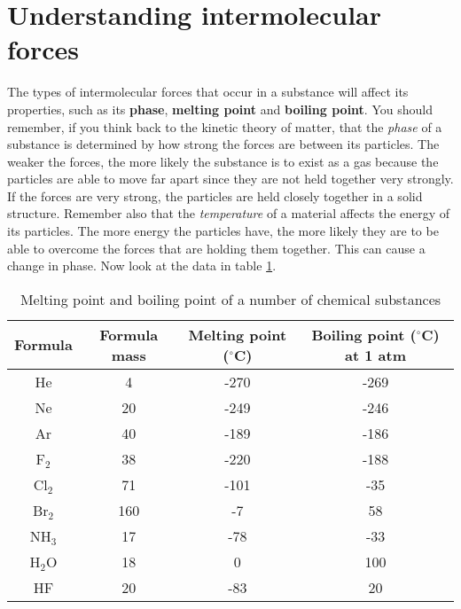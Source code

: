\section{Understanding intermolecular forces}
\label{sec:intermolecular:understanding}

The types of intermolecular forces that occur in a substance will affect its properties, such as its \textbf{phase}, \textbf{melting point} and \textbf{boiling point}. You should remember, if you think back to the kinetic theory of matter, that the \textit{phase} of a substance is determined by how strong the forces are between its particles. The weaker the forces, the more likely the substance is to exist as a gas because the particles are able to move far apart since they are not held together very strongly. If the forces are very strong, the particles are held closely together in a solid structure. Remember also that the \textit{temperature} of a material affects the energy of its particles. The more energy the particles have, the more likely they are to be able to overcome the forces that are holding them together. This can cause a change in phase.
\vspace{-.5cm}
Now look at the data in table \ref{tab:intermolecular:mpbp}.

\begin{table}[h]
\begin{center}
\begin{tabular}{|c|c|c|c|}\hline
\textbf{Formula} & \textbf{Formula mass} & \textbf{Melting point} ($^{\circ}$C) & \textbf{Boiling point} ($^{\circ}$C) at 1 atm \\\hline
He & 4 & -270 & -269 \\\hline
Ne & 20 & -249 & -246 \\\hline
Ar & 40 & -189 & -186 \\\hline
F$_{2}$ & 38 & -220 & -188 \\\hline
Cl$_{2}$ & 71 & -101 & -35 \\\hline
Br$_{2}$ & 160 & -7 & 58 \\\hline
NH$_{3}$ & 17 & -78 & -33 \\\hline
H$_{2}$O & 18 & 0 & 100 \\\hline
HF & 20 & -83 & 20 \\\hline
\end{tabular}
\caption{Melting point and boiling point of a number of chemical substances}
\label{tab:intermolecular:mpbp}
\end{center}
\end{table}

